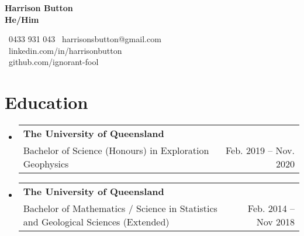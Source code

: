 \documentclass[letterpaper,11pt]{article}
\makeatletter
\newcommand{\resumeItem}[2]{
  \item\small{
    \textbf{#1}{#2 \vspace{-2pt}}
  }
}
\newcommand{\resumeSubheading}[4]{
  \vspace{-1pt}\item
    \begin{tabular*}{0.97\textwidth}[t]{l@{\extracolsep{\fill}}r}
      \textbf{#1} & #2 \\
      {\small #3} & {\small #4} \\
    \end{tabular*}\vspace{-5pt}
}
\newcommand{\resumeSubSubheading}[2]{
    \begin{tabular*}{0.97\textwidth}{l@{\extracolsep{\fill}}r}
      {\small#1} & {\small #2} \\
    \end{tabular*}\vspace{-5pt}
}
\newcommand{\resumeSubHeadingListStart}{\begin{itemize}[leftmargin=*]}
\newcommand{\resumeSubHeadingListEnd}{\end{itemize}}
\makeatother
\begin{document}
\begin{minipage}[c]{.4\linewidth}
    {\textbf{\Huge Harrison Button \\ \small{He/Him} }}%
\end{minipage}%
\begin{minipage}[c]{.6\linewidth}
    \begin{flushright}
        ~0433 931 043 \hspace{1pt} ~harrisonsbutton@gmail.com \\
        ~linkedin.com/in/harrisonbutton \\ 
        ~github.com/ignorant-fool
    \end{flushright}
\end{minipage}

    

\section{Education}
\resumeSubHeadingListStart
\resumeSubheading
    {The University of Queensland}{}
    {Bachelor of Science (Honours) in Exploration Geophysics}{Feb. 2019 -- Nov. 2020}
\resumeSubheading
    {The University of Queensland}{}
    {Bachelor of Mathematics / Science in Statistics and Geological Sciences (Extended)}{Feb. 2014 -- Nov 2018}
\resumeSubHeadingListEnd
\end{document}
